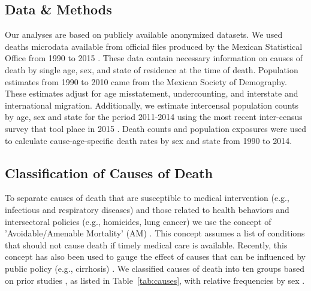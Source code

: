 \documentclass[11.5pt]{article}
\begin{document}
\begin{spacing}{1.5}
\section*{Data \& Methods} 
Our analyses are based on publicly available anonymized datasets. We used deaths microdata available from official files produced by the
Mexican Statistical Office from 1990 to 2015 \citep{INEGI}. These data contain necessary
information on causes of death by single age, sex, and state of residence at the
time of death. Population estimates from 1990 to 2010 came from the Mexican Society of Demography. These estimates adjust for age misstatement, undercounting, and interstate and international migration. Additionally, we estimate intercensal population counts by age, sex and state for the period 2011-2014 using the most recent inter-census survey that tool place in 2015  \citep{INEGI}. Death counts and population exposures were used to calculate cause-age-specific death rates by sex and state from 1990 to 2014.

\subsection*{Classification of Causes of Death}

To separate causes of death that are susceptible to medical intervention (e.g.,
infectious and respiratory diseases) and those related to health behaviors and
intersectoral policies (e.g., homicides, lung cancer) we use the concept of
'Avoidable/Amenable Mortality' (AM) \citep{nolte&mckee2004, nolte&mckee2008}. This
concept assumes a list of conditions that should not cause death if timely medical care is available. Recently, this concept has also been used to gauge the
effect of causes that can be influenced by public policy (e.g., cirrhosis) \citep{elo2014}. We classified causes of death into ten groups based on prior studies , as listed in Table~\ref{tab:causes}, with
relative frequencies by sex \citep{elo2014, Aburto2015}.


\end{spacing}
\end{document}
